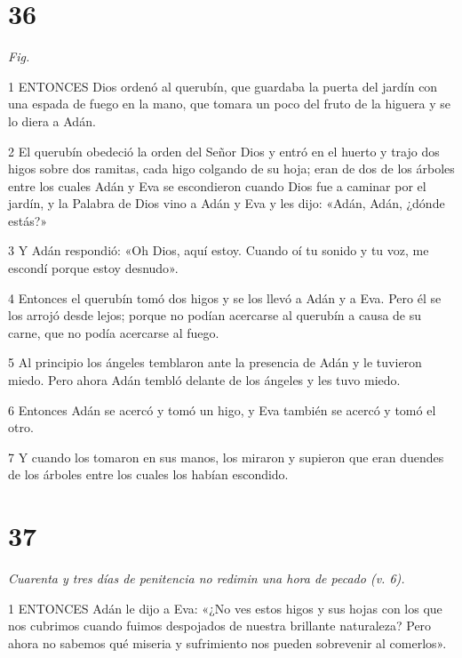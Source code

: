 \chapter{36}

\par \textit{Fig.}

\par 1 ENTONCES Dios ordenó al querubín, que guardaba la puerta del jardín con una espada de fuego en la mano, que tomara un poco del fruto de la higuera y se lo diera a Adán.

\par 2 El querubín obedeció la orden del Señor Dios y entró en el huerto y trajo dos higos sobre dos ramitas, cada higo colgando de su hoja; eran de dos de los árboles entre los cuales Adán y Eva se escondieron cuando Dios fue a caminar por el jardín, y la Palabra de Dios vino a Adán y Eva y les dijo: «Adán, Adán, ¿dónde estás?»

\par 3 Y Adán respondió: «Oh Dios, aquí estoy. Cuando oí tu sonido y tu voz, me escondí porque estoy desnudo».

\par 4 Entonces el querubín tomó dos higos y se los llevó a Adán y a Eva. Pero él se los arrojó desde lejos; porque no podían acercarse al querubín a causa de su carne, que no podía acercarse al fuego.

\par 5 Al principio los ángeles temblaron ante la presencia de Adán y le tuvieron miedo. Pero ahora Adán tembló delante de los ángeles y les tuvo miedo.

\par 6 Entonces Adán se acercó y tomó un higo, y Eva también se acercó y tomó el otro.

\par 7 Y cuando los tomaron en sus manos, los miraron y supieron que eran duendes de los árboles entre los cuales los habían escondido.

\chapter{37}

\par \textit{Cuarenta y tres días de penitencia no redimin una hora de pecado (v. 6).}

\par 1 ENTONCES Adán le dijo a Eva: «¿No ves estos higos y sus hojas con los que nos cubrimos cuando fuimos despojados de nuestra brillante naturaleza? Pero ahora no sabemos qué miseria y sufrimiento nos pueden sobrevenir al comerlos».

